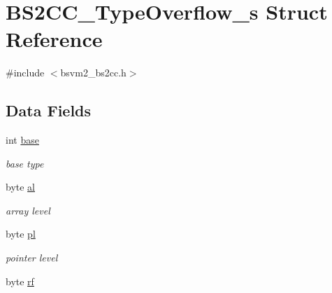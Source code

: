 \hypertarget{structBS2CC__TypeOverflow__s}{\section{B\-S2\-C\-C\-\_\-\-Type\-Overflow\-\_\-s Struct Reference}
\label{structBS2CC__TypeOverflow__s}
}


{\ttfamily \#include $<$bsvm2\-\_\-bs2cc.\-h$>$}

\subsection*{Data Fields}
\begin{DoxyCompactItemize}
\item 
\hypertarget{structBS2CC__TypeOverflow__s_a6b0a5622ddbdde184935c13cf2f594c7}{int \hyperlink{structBS2CC__TypeOverflow__s_a6b0a5622ddbdde184935c13cf2f594c7}{base}}\label{structBS2CC__TypeOverflow__s_a6b0a5622ddbdde184935c13cf2f594c7}

\begin{DoxyCompactList}\small\item\em base type \end{DoxyCompactList}\item 
\hypertarget{structBS2CC__TypeOverflow__s_a3f05bb42bcf17ea52e3ca6835bee0349}{byte \hyperlink{structBS2CC__TypeOverflow__s_a3f05bb42bcf17ea52e3ca6835bee0349}{al}}\label{structBS2CC__TypeOverflow__s_a3f05bb42bcf17ea52e3ca6835bee0349}

\begin{DoxyCompactList}\small\item\em array level \end{DoxyCompactList}\item 
\hypertarget{structBS2CC__TypeOverflow__s_a1870f1fb09719503e30560152cc41477}{byte \hyperlink{structBS2CC__TypeOverflow__s_a1870f1fb09719503e30560152cc41477}{pl}}\label{structBS2CC__TypeOverflow__s_a1870f1fb09719503e30560152cc41477}

\begin{DoxyCompactList}\small\item\em pointer level \end{DoxyCompactList}\item 
\hypertarget{structBS2CC__TypeOverflow__s_addc444f4d08d75005cc7a8cd8d904f4b}{byte \hyperlink{structBS2CC__TypeOverflow__s_addc444f4d08d75005cc7a8cd8d904f4b}{rf}}\label{structBS2CC__TypeOverflow__s_addc444f4d08d75005cc7a8cd8d904f4b}


\end{DoxyCompactItemize}
